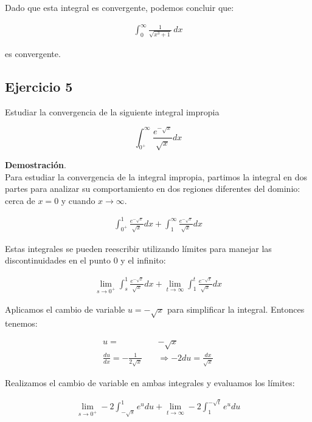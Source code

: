 \documentclass{article}
\begin{document}
    Dado que esta integral es convergente, podemos concluir que:

    \begin{align*}
    \int_{0}^{\infty} \frac{1}{\sqrt{x^{3}+1}} \, dx
    \end{align*}

    es convergente.

    \subsection*{Ejercicio 5}

    Estudiar la convergencia de la siguiente integral impropia

    $$
    \int_{0^{+}}^{\infty} \frac{e^{-\sqrt{x}}}{\sqrt{x}} d x
    $$

    \textbf{Demostración}.\\

    Para estudiar la convergencia de la integral impropia, partimos la integral en dos partes para analizar su comportamiento en dos regiones diferentes del dominio: cerca de \(x = 0\) y cuando \(x \rightarrow \infty\).

    \begin{align*}
    \int_{0^{+}}^{1} \frac{e^{-\sqrt{x}}}{\sqrt{x}} d x+\int_{1}^{\infty} \frac{e^{-\sqrt{x}}}{\sqrt{x}} d x
    \end{align*}

    Estas integrales se pueden reescribir utilizando límites para manejar las discontinuidades en el punto 0 y el infinito:

    \begin{align*}
    \lim_{s \rightarrow 0^{+}} \int_{s}^{1} \frac{e^{-\sqrt{x}}}{\sqrt{x}} d x + \lim_{t \rightarrow \infty} \int_{1}^{t} \frac{e^{-\sqrt{x}}}{\sqrt{x}} d x
    \end{align*}

    Aplicamos el cambio de variable \( u = -\sqrt{x} \) para simplificar la integral. Entonces tenemos:

   $$ \begin{aligned}
      u = & -\sqrt{x} \\
      \frac{d u}{d x} = -\frac{1}{2 \sqrt{x}} \quad &\Rightarrow -2 d u = \frac{d x}{\sqrt{x}}
    \end{aligned}$$

    Realizamos el cambio de variable en ambas integrales y evaluamos los límites:

    \begin{align*}
    \lim_{s \rightarrow 0^{+}} -2 \int_{-\sqrt{s}}^{1} e^{u} d u + \lim_{t \rightarrow \infty} -2 \int_{1}^{-\sqrt{t}} e^{u} d u
    \end{align*}
\end{document}
